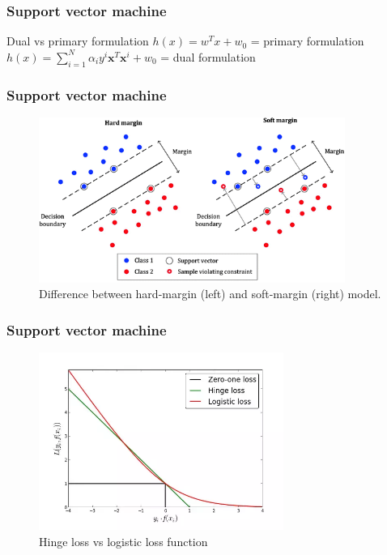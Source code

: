 \documentclass{beamer}
\begin{document}
\begin{frame}
	\frametitle{Support vector machine}
	\begin{block}{Dual vs primary formulation}
		$h(x) = w^{T}x + w_0$  = primary formulation 	\newline
		$h(x) = \sum_{i = 1}^{N} \alpha_i y^{i} \textbf{x}^{T}\textbf{x}^{i} + w_0  $  = dual formulation
 	\end{block}
	 
\end{frame}

\begin{frame}
	\frametitle{Support vector machine}	
	\begin{figure}[h]
		\centering
		\includegraphics[width=10cm]{margin}
		\caption{Difference between hard-margin (left) and soft-margin (right) model.}
	\end{figure}
	
\end{frame}

\begin{frame}
	\frametitle{Support vector machine}	
	\begin{figure}[h]
		\centering
		\includegraphics[width=8cm]{hinge-loss}
		\caption{Hinge loss vs logistic loss function}
	\end{figure}
	
\end{frame}
\end{document}
